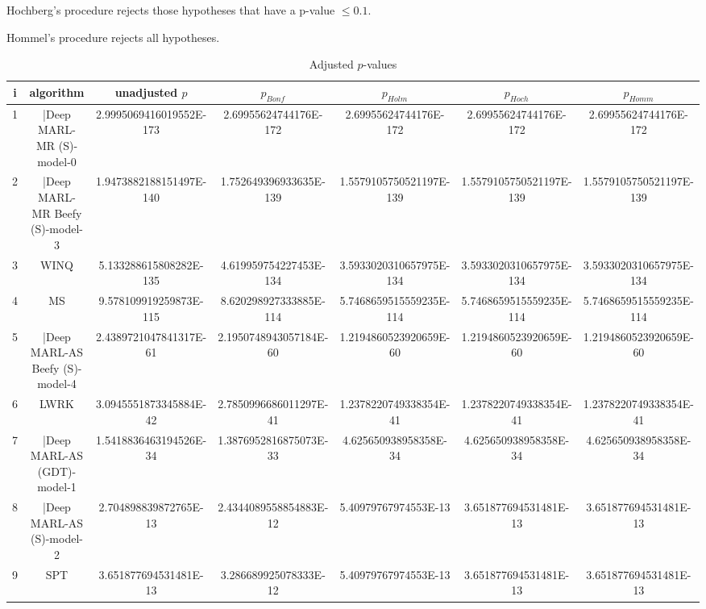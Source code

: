 \documentclass[a3paper,10pt]{article}
\begin{document}
Hochberg's procedure rejects those hypotheses that have a p-value $\le0.1$.


Hommel's procedure rejects all hypotheses.


\begin{table}[!htp]
\centering\tiny
\caption{Adjusted $p$-values}
\begin{tabular}{ccccccc}
i&algorithm&unadjusted $p$&$p_{Bonf}$&$p_{Holm}$&$p_{Hoch}$&$p_{Homm}$\\
\hline
1&|Deep MARL-MR (S)-model-0&2.9995069416019552E-173&2.69955624744176E-172&2.69955624744176E-172&2.69955624744176E-172&2.69955624744176E-172\\
2&|Deep MARL-MR Beefy (S)-model-3&1.9473882188151497E-140&1.752649396933635E-139&1.5579105750521197E-139&1.5579105750521197E-139&1.5579105750521197E-139\\
3&WINQ&5.133288615808282E-135&4.619959754227453E-134&3.5933020310657975E-134&3.5933020310657975E-134&3.5933020310657975E-134\\
4&MS&9.578109919259873E-115&8.620298927333885E-114&5.7468659515559235E-114&5.7468659515559235E-114&5.7468659515559235E-114\\
5&|Deep MARL-AS Beefy (S)-model-4&2.4389721047841317E-61&2.1950748943057184E-60&1.2194860523920659E-60&1.2194860523920659E-60&1.2194860523920659E-60\\
6&LWRK&3.0945551873345884E-42&2.7850996686011297E-41&1.2378220749338354E-41&1.2378220749338354E-41&1.2378220749338354E-41\\
7&|Deep MARL-AS (GDT)-model-1&1.5418836463194526E-34&1.3876952816875073E-33&4.625650938958358E-34&4.625650938958358E-34&4.625650938958358E-34\\
8&|Deep MARL-AS (S)-model-2&2.704898839872765E-13&2.4344089558854883E-12&5.40979767974553E-13&3.651877694531481E-13&3.651877694531481E-13\\
9&SPT&3.651877694531481E-13&3.286689925078333E-12&5.40979767974553E-13&3.651877694531481E-13&3.651877694531481E-13\\
\hline
\end{tabular}
\end{table}
\end{document}
